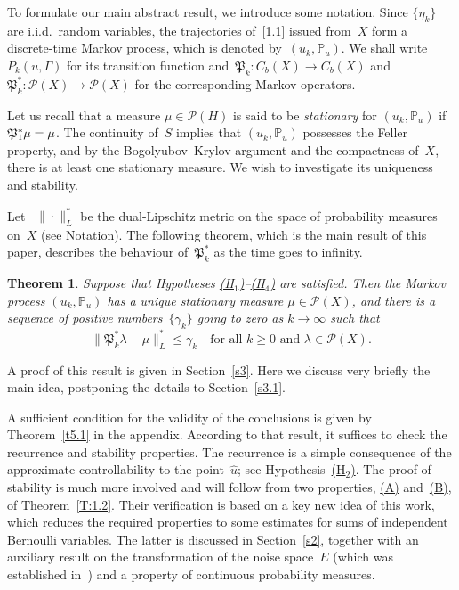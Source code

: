 \documentclass[11pt]{article}
\theoremstyle{plain}
\newtheorem{theorem}{Theorem}[section]
\theoremstyle{definition}
\let\mathcal\mathscr
\theoremstyle{plain}
\numberwithin{equation}{section}
\newcommand{\IP}{{\mathbb P}}
\newcommand{\PP}{{\mathcal P}}
\newcommand{\PPPP}{{\mathfrak P}}
\begin{document}
To formulate our main abstract result, we introduce some notation. Since $\{\eta_k\}$ are i.i.d.\ random variables, the trajectories of~\eqref{1.1} issued from~$X$ form a discrete-time Markov process, which is denoted by~$(u_k,\IP_u)$. We shall write $P_k(u,\Gamma)$ for its transition function and~$\PPPP_k:C_b(X)\to C_b(X)$ and $\PPPP_k^*:\PP(X)\to\PP(X)$ for the corresponding Markov operators.

Let us recall that a measure $\mu \in \PP(H)$ is said to be \emph{stationary} for $(u_k,\IP_u)$ if~$\PPPP^*_1\mu=\nobreak\mu$. The continuity of~$S$ implies that $(u_k,\IP_u)$ possesses the Feller property, and by the Bogolyubov--Krylov argument and the compactness of~$X$, there is at least one stationary measure. We wish to investigate its uniqueness and stability.

Let ~$\|\cdot\|_L^*$ be the dual-Lipschitz metric on the space of probability measures on~$X$ (see Notation). The following theorem, which is the main result of this paper, describes the behaviour of~$\PPPP_k^*$ as the time goes to infinity.


\begin{theorem} \label{t1.1}
Suppose that Hypotheses \hyperlink{H1}{\rm(H$_1$)}--\hyperlink{H4}{\rm(H$_4$)} are satisfied. Then the Markov process $(u_k,\IP_u)$ has a unique stationary measure $\mu\in \PP(X)$, and there is a sequence of positive numbers~$\{\gamma_k\}$ going to zero as $k\to\infty$ such that
\begin{equation} \label{1.6}
\|\PPPP_k^*\lambda-\mu\|_L^*\le \gamma_k\quad\text{for all $k\ge0$ and $\lambda\in\PP(X)$}.
\end{equation}
\end{theorem}

A proof of this result is given in Section~\ref{s3}. Here we discuss very briefly the main idea, postponing the details to Section~\ref{s3.1}.

A sufficient condition for the validity of the conclusions is given by Theorem~\ref{t5.1} in the appendix. According to that result, it suffices to check the recurrence and stability properties. The recurrence is a simple consequence of the approximate controllability to the point~$\hat u$; see Hypothesis~\hyperlink{H2}{(H$_2$)}. The proof of stability is much more involved and will follow from two properties, \hyperlink{(A)}{(A)} and~\hyperlink{(B)}{(B)}, of Theorem~\ref{T:1.2}. Their verification is based on a key new idea of this work, which reduces the required properties to some estimates for sums of independent Bernoulli variables. The latter is discussed in Section~\ref{s2}, together with an auxiliary result on the transformation of the noise space~$E$ (which was established in~\cite{KNS-2020}) and a property of continuous probability measures.
\end{document}
